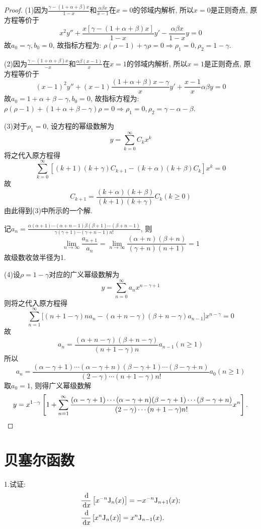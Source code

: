 \begin{proof}
(1)因为$\frac{\gamma-(1+\alpha+\beta)x}{1-x}$和$\frac{\alpha\beta x}{x-1}$在$x=0$的邻域内解析, 所以$x=0$是正则奇点, 原方程等价于
\[x^2y''+\frac{x[\gamma-(1+\alpha+\beta)x]}{1-x}y'-\frac{\alpha\beta x}{1-x}y=0\]
故$a_0=\gamma,b_0=0$, 故指标方程为: $\rho(\rho-1)+\gamma\rho=0\Rightarrow\rho_1=0,\rho_2=1-\gamma$.

(2)因为$\frac{\gamma-(1+\alpha+\beta)x}{-x}$和$\frac{\alpha\beta(x-1)}{x}$在$x=1$的邻域内解析, 所以$x=1$是正则奇点, 原方程等价于
\[(x-1)^2y''+(x-1)\frac{(1+\alpha+\beta)x-\gamma}{x}y'+\frac{x-1}{x}\alpha\beta y=0\]
故$a_0=1+\alpha+\beta-\gamma,b_0=0$, 
故指标方程为: $\rho(\rho-1)+(1+\alpha+\beta-\gamma)\rho=0\Rightarrow\rho_1=0,\rho_2=\gamma-\alpha-\beta$.

(3)对于$\rho_1=0$, 设方程的幂级数解为
\[y=\sum_{k=0}^{\infty}C_kx^k\]
将之代入原方程得
\[\sum_{k=0}^{\infty}\left[(k+1)(k+\gamma)C_{k+1}-(k+\alpha)(k+\beta)C_k\right]x^k=0\]
故\[C_{k+1}=\frac{(k+\alpha)(k+\beta)}{(k+1)(k+\gamma)}C_k(k\geq0)\]
由此得到(3)中所示的一个解.

记$a_n=\frac{\alpha(\alpha+1)\cdots(\alpha+n-1)\beta(\beta+1)\cdots(\beta+n-1)}{\gamma(\gamma+1)\cdots(\gamma+n-1)n!}$, 则
\[\lim_{n\to\infty}\frac{a_{n+1}}{a_n}=\lim_{n\to\infty}\frac{(\alpha+n)(\beta+n)}{(\gamma+n)(n+1)}=1\]
故级数收敛半径为1.

(4)设$\rho=1-\gamma$对应的广义幂级数解为
\[y=\sum_{n=0}^{\infty}a_nx^{n-\gamma+1}\]
则将之代入原方程得
\[\sum_{n=1}^{\infty}\big[(n+1-\gamma)na_n-(\alpha+n-\gamma)(\beta+n-\gamma)a_{n-1}\big]x^{n-\gamma}=0\]
故
\[a_n=\frac{(\alpha+n-\gamma)(\beta+n-\gamma)}{(n+1-\gamma)n}a_{n-1}(n\geq1)\]
所以
\[a_n=\frac{(\alpha-\gamma+1)\cdots(\alpha-\gamma+n)(\beta-\gamma+1)\cdots(\beta-\gamma+n)}{(2-\gamma)\cdots(n+1-\gamma)n!}a_0(n\geq1)\]
取$a_0=1$, 则得广义幂级数解
\[y=x^{1-\gamma}\left[1+\sum_{n=1}^{\infty}\frac{(\alpha-\gamma+1)\cdots(\alpha-\gamma+n)(\beta-\gamma+1)\cdots(\beta-\gamma+n)}{(2-\gamma)\cdots(n+1-\gamma)n!}x^n\right].\qedhere\]
\end{proof}


\section{贝塞尔函数}


1.试证:\[\begin{split}&\frac{\,\mathrm{d}}{\,\mathrm{d} x}\left[x^{-n}\mathrm{J}_n(x)\right]=-x^{-n}\mathrm{J}_{n+1}(x);\\
&\frac{\,\mathrm{d}}{\,\mathrm{d} x}\left[x^n\mathrm{J}_n(x)\right]=x^n\mathrm{J}_{n-1}(x).\end{split}\]

